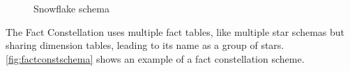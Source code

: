 \begin{figure}[!htb]
  \caption{Snowflake schema}\label{fig:snowflakeschema}
  \vspace{2mm}
  \begin{center}
  \end{center}
  \vspace{1mm}
  \legenda{}
\end{figure}

The Fact Constellation uses multiple fact tables, like multiple star schemas but sharing dimension tables, leading to its name as a group of stars.
\autoref{fig:factconstschema} shows an example of a fact constellation scheme.

